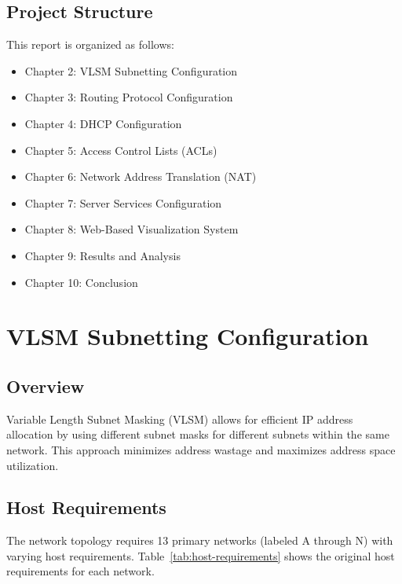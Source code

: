 \documentclass[12pt,a4paper]{report}
\begin{document}
\section{Project Structure}

This report is organized as follows:

\begin{itemize}
    \item Chapter 2: VLSM Subnetting Configuration
    \item Chapter 3: Routing Protocol Configuration
    \item Chapter 4: DHCP Configuration
    \item Chapter 5: Access Control Lists (ACLs)
    \item Chapter 6: Network Address Translation (NAT)
    \item Chapter 7: Server Services Configuration
    \item Chapter 8: Web-Based Visualization System
    \item Chapter 9: Results and Analysis
    \item Chapter 10: Conclusion
\end{itemize}

\newpage

\chapter{VLSM Subnetting Configuration}

\section{Overview}

Variable Length Subnet Masking (VLSM) allows for efficient IP address allocation by using different subnet masks for different subnets within the same network. This approach minimizes address wastage and maximizes address space utilization.

\section{Host Requirements}

The network topology requires 13 primary networks (labeled A through N) with varying host requirements. Table~\ref{tab:host-requirements} shows the original host requirements for each network.
\end{document}

